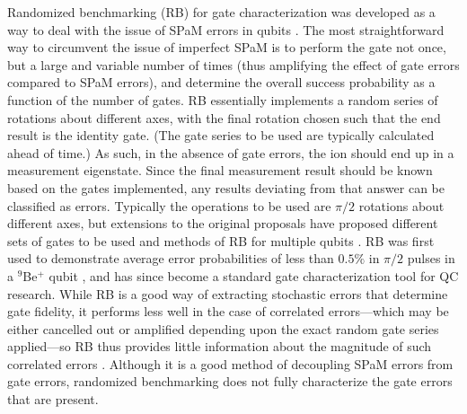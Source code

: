 \documentclass[%
reprint,
 amsmath,amssymb,
]{revtex4-1}
\begin{document}
Randomized benchmarking (RB) for gate characterization was developed as a way to deal with the issue of SPaM errors in qubits \cite{EmersonRB2005,KnillRB2008}. The most straightforward way to circumvent the issue of imperfect SPaM is to perform the gate not once, but a large and variable number of times (thus amplifying the effect of gate errors compared to SPaM errors), and determine the overall success probability as a function of the number of gates. RB essentially implements a random series of rotations about different axes, with the final rotation chosen such that the end result is the identity gate. (The gate series to be used are typically calculated ahead of time.) As such, in the absence of gate errors, the ion should end up in a measurement eigenstate. Since the final measurement result should be known based on the gates implemented, any results deviating from that answer can be classified as errors. Typically the operations to be used are $\pi/2$ rotations about different axes, but extensions to the original proposals have proposed different sets of gates to be used \cite{DankertUnitaryRB2009,Carignan-DugasDihedralRB2015,CrossDihedralRB2016} and methods of RB for multiple qubits \cite{MagesanScalableRB2011, MagesanCharacterize2012}. RB was first used to demonstrate average error probabilities of less than $0.5 \%$ in $\pi/2$ pulses in a $^9$Be$^+$ qubit \cite{KnillRB2008}, and has since become a standard gate characterization tool for QC research. While RB is a good way of extracting stochastic errors that determine gate fidelity, it performs less well in the case of correlated errors---which may be either cancelled out or amplified depending upon the exact random gate series applied---so RB thus provides little information about the magnitude of such correlated errors \cite{BallCorrNoiseRB2016,MavadiaExperimental2018}. Although it is a good method of decoupling SPaM errors from gate errors, randomized benchmarking does not fully characterize the gate errors that are present.
\end{document}
